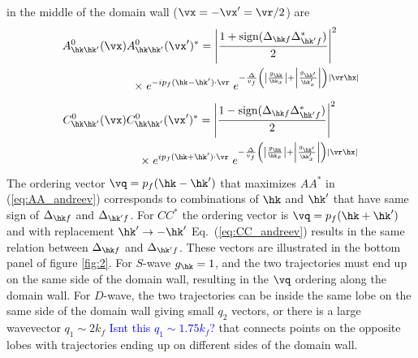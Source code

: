 \documentclass[prb,aps,showpacs,amsmath,twocolumn,10pt]{revtex4-1}
\newcommand{\blue}{\textcolor{blue}}
\newcommand{\sign}{\mbox{sign}}
\begin{document}
in the middle of the domain wall ($\vx=-\vx'=\vr/2$) are 
\begin{align} 
\label{eq:AA_andreev}
\begin{split}
A^0_{\hk\hk'}(\vx) A^{0}_{\hk\hk'}(\vx')^* 
= \left|\frac{1 + \sign( \Delta_{\hk f } \Delta^*_{\hk' f } )}{2}\right|^2 \qquad 
\\
\times \; e^{-ip_f(\hk-\hk')\cdot\vr}  \; 
e^{- \frac{\Delta}{v_f} \left( \left| \frac{g_{\hk}}{\hk_x} \right| +  \left| \frac{g_{\hk'}}{\hk'_x} \right|\right) 
 | \vr\hx|}
\end{split}\end{align}
%
\begin{align} 
\label{eq:CC_andreev}
\begin{split}
C^0_{\hk\hk'}(\vx) C^{0}_{\hk\hk'}(\vx')^* 
= \left|\frac{1 - \sign( \Delta_{\hk f } \Delta^*_{\hk' f } )}{2}\right|^2 \qquad
\\
\times \; e^{ip_f(\hk+\hk')\cdot\vr}  \; 
e^{- \frac{\Delta}{v_f} \left( \left| \frac{g_{\hk}}{\hk_x} \right| +  \left| \frac{g_{\hk'}}{\hk'_x} \right|\right) 
 | \vr\hx|}
\end{split}\end{align}
The ordering vector $\vq= p_f(\hk-\hk') $ that maximizes $AA^*$ in (\ref{eq:AA_andreev}) 
corresponds to combinations of $\hk$ and $\hk'$ that 
have same sign of $\Delta_{\hk f }$ and $\Delta_{\hk' f }$. 
For $CC^*$ the ordering vector is $\vq = p_f(\hk+\hk')$ and with replacement $\hk' \to -\hk'$ 
Eq.~(\ref{eq:CC_andreev}) results in the same relation between $\Delta_{\hk f }$ and $\Delta_{\hk' f }$. 
These vectors are illustrated in the bottom panel of figure \ref{fig:2}. 
For $S$-wave $g_{\hk}=1$, and the two trajectories must end up on the same side of the domain wall, 
resulting in the $\vq$ ordering along the domain wall. For $D$-wave, the two trajectories 
can be inside the same lobe on the same side of the domain wall giving small $q_2$ vectors, 
or there is a large wavevector $q_1 \sim 2 k_f$ \blue{Isnt this $q_1 \sim 1.75 k_f$?} that connects points on the opposite lobes with trajectories 
ending up on different sides of the domain wall. 
\end{document}
